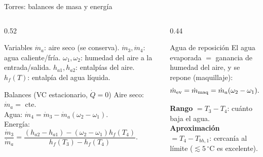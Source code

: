 \documentclass[aspectratio=169,10pt]{beamer}
\begin{document}
\begin{frame}{Torres: balances de masa y energía}
\begin{columns}[T]
\begin{column}{0.52\textwidth}
\begin{cardidea}{Variables}{\faListUl}
\footnotesize
$\dot m_a$: aire seco (se conserva). $\dot m_3,\dot m_4$: agua caliente/fría. $\omega_1,\omega_2$: humedad del aire a la entrada/salida. $h_{a1},h_{a2}$: entalpías del aire. $h_f(T)$: entalpía del agua líquida.
\end{cardidea}
\vspace{0.9mm}
\begin{cardgear}{Balances (VC estacionario, $\dot Q=0$)}{\faSuperscript}
\footnotesize
Aire seco: $\dot m_a=$ cte.\\[0.4mm]
Agua: $\dot m_4=\dot m_3-\dot m_a(\omega_2-\omega_1)$.\\[0.5mm]
Energía: $\dfrac{\dot m_3}{\dot m_a}=\dfrac{(h_{a2}-h_{a1})-(\omega_2-\omega_1)h_f(T_4)}{h_f(T_3)-h_f(T_4)}$.
\end{cardgear}
\end{column}
\begin{column}{0.44\textwidth}
\begin{cardidea}{Agua de reposición}{\faPlusCircle}
El agua evaporada $=$ ganancia de humedad del aire, y se repone (maquillaje):
$$\dot m_{\rm ev}=\dot m_{\rm maq}=\dot m_a(\omega_2-\omega_1).$$
\end{cardidea}
\vspace{0.9mm}
\begin{cardnota}[\faRulerHorizontal]
\textbf{Rango} $=T_3-T_4$: cuánto baja el agua.\\[0.4mm]
\textbf{Aproximación} $=T_4-T_{bh,1}$: cercanía al límite ($\lesssim5\,^\circ$C es excelente).
\end{cardnota}
\end{column}
\end{columns}
\end{frame}
\end{document}
